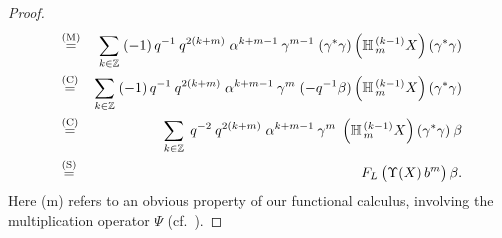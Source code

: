 \begin{proof}
\begin{eqnarray*}
&\stackrel{\rm (M)}{=}&
       \sum_{k\in\ZZ} \;  (-1)\,q^{-1}\: q^{2(k+m)}
       \; \alpha^{k+m-1}\: \gamma^{m-1} \;
       (\gamma^*\gamma) \left(\YaH{m}{k-1}X \right)(\gamma^*\gamma) \\
&\stackrel{\rm (C)}{=}&
       \sum_{k\in\ZZ} \;  (-1)\, q^{-1}\: q^{2(k+m)}
       \; \alpha^{k+m-1}\: \gamma^m \;
       (-q^{-1} \beta) \left(\YaH{m}{k-1}X \right)(\gamma^*\gamma) \\
&\stackrel{\rm (C)}{=}&
       \sum_{k\in\ZZ} \; q^{-2} \: q^{2(k+m)}  \; \alpha^{k+m-1}\: \gamma^m \;
       \left(\YaH{m}{k-1}X \right)(\gamma^*\gamma)  \: \beta \\
&\stackrel{\rm (S)}{=}&
       F_L\left(\vertM \Upsilon(X)\, b^m \right) \beta.
\end{eqnarray*}
Here ({\sc m}) refers to an obvious property of our functional calculus,
involving the {\sc m}ultiplication operator $\Psi$
(cf.\ \mbox{\cite[lemma 3.5.1.2]{Jeroen:QE2:haar}}).
\end{proof}
